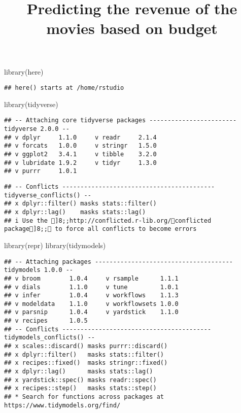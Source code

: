 \documentclass[
]{article}
\title{Predicting the revenue of the movies based on budget}
\author{}
\date{\vspace{-2.5em}}
\newenvironment{Shaded}{\begin{snugshade}}{\end{snugshade}}
\newcommand{\FunctionTok}[1]{\textcolor[rgb]{0.00,0.00,0.00}{#1}}
\newcommand{\NormalTok}[1]{#1}
\begin{document}
\maketitle

\begin{Shaded}
\begin{Highlighting}[]
\FunctionTok{library}\NormalTok{(here)}
\end{Highlighting}
\end{Shaded}

\begin{verbatim}
## here() starts at /home/rstudio
\end{verbatim}

\begin{Shaded}
\begin{Highlighting}[]
\FunctionTok{library}\NormalTok{(tidyverse)}
\end{Highlighting}
\end{Shaded}

\begin{verbatim}
## -- Attaching core tidyverse packages ------------------------ tidyverse 2.0.0 --
## v dplyr     1.1.0     v readr     2.1.4
## v forcats   1.0.0     v stringr   1.5.0
## v ggplot2   3.4.1     v tibble    3.2.0
## v lubridate 1.9.2     v tidyr     1.3.0
## v purrr     1.0.1
\end{verbatim}

\begin{verbatim}
## -- Conflicts ------------------------------------------ tidyverse_conflicts() --
## x dplyr::filter() masks stats::filter()
## x dplyr::lag()    masks stats::lag()
## i Use the ]8;;http://conflicted.r-lib.org/conflicted package]8;; to force all conflicts to become errors
\end{verbatim}

\begin{Shaded}
\begin{Highlighting}[]
\FunctionTok{library}\NormalTok{(repr)}
\FunctionTok{library}\NormalTok{(tidymodels)}
\end{Highlighting}
\end{Shaded}

\begin{verbatim}
## -- Attaching packages -------------------------------------- tidymodels 1.0.0 --
## v broom        1.0.4     v rsample      1.1.1
## v dials        1.1.0     v tune         1.0.1
## v infer        1.0.4     v workflows    1.1.3
## v modeldata    1.1.0     v workflowsets 1.0.0
## v parsnip      1.0.4     v yardstick    1.1.0
## v recipes      1.0.5     
## -- Conflicts ----------------------------------------- tidymodels_conflicts() --
## x scales::discard() masks purrr::discard()
## x dplyr::filter()   masks stats::filter()
## x recipes::fixed()  masks stringr::fixed()
## x dplyr::lag()      masks stats::lag()
## x yardstick::spec() masks readr::spec()
## x recipes::step()   masks stats::step()
## * Search for functions across packages at https://www.tidymodels.org/find/
\end{verbatim}
\end{document}
